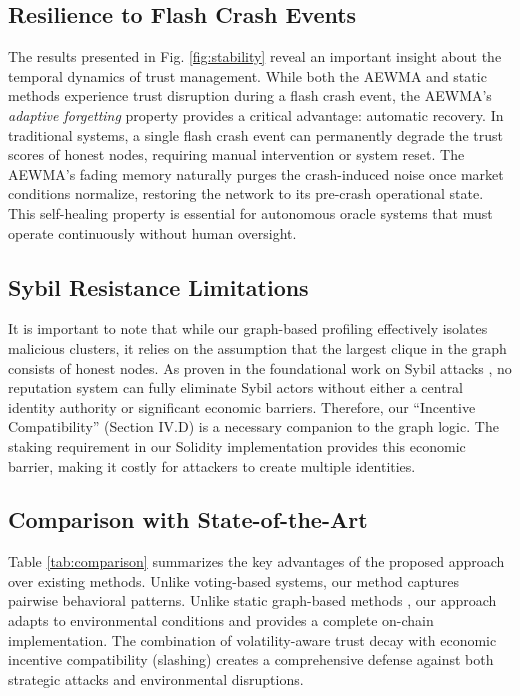 \documentclass{ieeeaccess}
\begin{document}
\subsection{Resilience to Flash Crash Events}
The results presented in Fig. \ref{fig:stability} reveal an important insight about the temporal dynamics of trust management. While both the AEWMA and static methods experience trust disruption during a flash crash event, the AEWMA's \textit{adaptive forgetting} property provides a critical advantage: automatic recovery. In traditional systems, a single flash crash event can permanently degrade the trust scores of honest nodes, requiring manual intervention or system reset. The AEWMA's fading memory naturally purges the crash-induced noise once market conditions normalize, restoring the network to its pre-crash operational state. This self-healing property is essential for autonomous oracle systems that must operate continuously without human oversight.

\subsection{Sybil Resistance Limitations}
It is important to note that while our graph-based profiling effectively isolates malicious clusters, it relies on the assumption that the largest clique in the graph consists of honest nodes. As proven in the foundational work on Sybil attacks \cite{b10}, no reputation system can fully eliminate Sybil actors without either a central identity authority or significant economic barriers. Therefore, our ``Incentive Compatibility'' (Section IV.D) is a necessary companion to the graph logic. The staking requirement in our Solidity implementation provides this economic barrier, making it costly for attackers to create multiple identities.

\subsection{Comparison with State-of-the-Art}
Table \ref{tab:comparison} summarizes the key advantages of the proposed approach over existing methods. Unlike voting-based systems, our method captures pairwise behavioral patterns. Unlike static graph-based methods \cite{b7}, our approach adapts to environmental conditions and provides a complete on-chain implementation. The combination of volatility-aware trust decay with economic incentive compatibility (slashing) creates a comprehensive defense against both strategic attacks and environmental disruptions.
\end{document}
